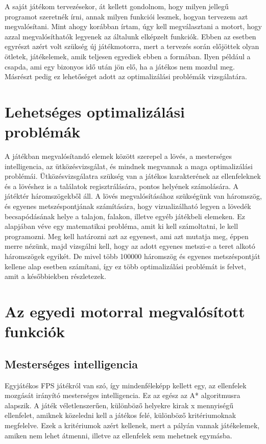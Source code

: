 A saját játékom tervezésekor, át kellett gondolnom, hogy milyen jellegű programot szeretnék írni, annak milyen funkciói lesznek, hogyan tervezem azt megvalósítani. Mint ahogy korábban írtam, úgy kell megválasztani a motort, hogy azzal megvalósíthatók legyenek az általunk elképzelt funkciók. Ebben az esetben egyrészt azért volt szükség új játékmotorra, mert a tervezés során előjöttek olyan ötletek, játékelemek, amik teljesen egyediek ebben a formában. Ilyen például a csapda, ami egy bizonyos idő után jön elő, ha a játékos nem mozdul meg. Másrészt pedig ez lehetőséget adott az optimalizálási problémák vizsgálatára.

\section{Lehetséges optimalizálási problémák}

A játékban megvalósítandó elemek között szerepel a lövés, a mesterséges intelligencia, az ütközésvizsgálat, és mindnek megvannak a maga optimalizálási problémái. Ütközésvizsgálatra szükség van a játékos karakterének az ellenfeleknek és a lövéshez is a találatok regisztrálására, pontos helyének számolására. A játéktér háromszögekből áll. A lövés megvalósításához szükségünk van háromszög, és egyenes metszéspontjának számítására, hogy vizualizálható legyen a lövedék becsapódásának helye a talajon, falakon, illetve egyéb játékbeli elemeken. Ez alapjában véve egy matematikai probléma, amit ki kell számoltatni, le kell programozni. Meg kell határozni azt az egyenest, ami azt mutatja meg, éppen merre nézünk, majd vizsgálni kell, hogy az adott egyenes metszi-e a teret alkotó háromszögek egyikét. De mivel több 100000 háromszög és egyenes metszéspontját kellene alap esetben számítani, így ez több optimalizálási problémát is felvet, amit a későbbiekben részletezek.

\section{Az egyedi motorral megvalósított funkciók}
\subsection{Mesterséges intelligencia}

Egyjátékos FPS játékról van szó, így mindenféleképp kellett egy, az ellenfelek mozgását irányító mesterséges intelligencia. Ez az egész az A* algoritmusra alapszik. A játék véletlenszerűen, különböző helyekre kirak x mennyiségű ellenfelet, amiknek közeledni kell a játékos felé, különböző kritériumoknak megfelelve. Ezek a kritériumok azért kellenek, mert a pályán vannak játékelemek, amiken nem lehet átmenni, illetve az ellenfelek sem mehetnek egymásba. 

